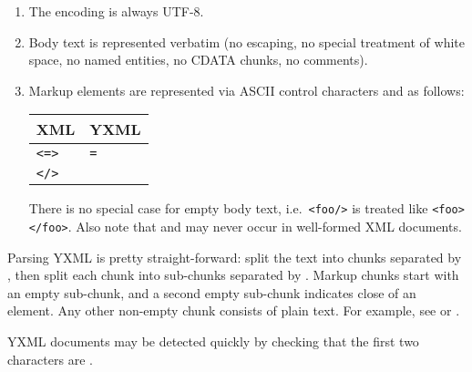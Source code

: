 \begin{isabellebody}
\begin{isamarkuptext}
\begin{enumerate}
  \item The encoding is always UTF-8.

  \item Body text is represented verbatim (no escaping, no special
  treatment of white space, no named entities, no CDATA chunks, no
  comments).

  \item Markup elements are represented via ASCII control characters
   and  as follows:

  \begin{tabular}{ll}
    XML & YXML \\\hline
    \verb|<|\isa{{\isachardoublequote}name\ attribute{\isachardoublequote}}\verb|=|\isa{{\isachardoublequote}value\ {\isasymdots}{\isachardoublequote}}\verb|>| &
    \isa{{\isachardoublequote}\isactrlbold X\isactrlbold Yname\isactrlbold Yattribute{\isachardoublequote}}\verb|=|\isa{{\isachardoublequote}value{\isasymdots}\isactrlbold X{\isachardoublequote}} \\
    \verb|</|\isa{name}\verb|>| & \isa{{\isachardoublequote}\isactrlbold X\isactrlbold Y\isactrlbold X{\isachardoublequote}} \\
  \end{tabular}

  There is no special case for empty body text, i.e.\ \verb|<foo/>| is treated like \verb|<foo></foo>|.  Also note that
   and  may never occur in
  well-formed XML documents.

  \end{enumerate}

  Parsing YXML is pretty straight-forward: split the text into chunks
  separated by , then split each chunk into
  sub-chunks separated by .  Markup chunks start
  with an empty sub-chunk, and a second empty sub-chunk indicates
  close of an element.  Any other non-empty chunk consists of plain
  text.  For example, see \hyperlink{file.~~/src/Pure/General/yxml.ML}{\mbox{}} or
  \hyperlink{file.~~/src/Pure/General/yxml.scala}{\mbox{}}.

  YXML documents may be detected quickly by checking that the first
  two characters are .%
\end{isamarkuptext}%
\isamarkuptrue%
%
\isadelimtheory
%
\endisadelimtheory
%
\isatagtheory
{}\isamarkupfalse%
%
\endisatagtheory
{\isafoldtheory}%
%
\isadelimtheory
%
\endisadelimtheory
\end{isabellebody}%
